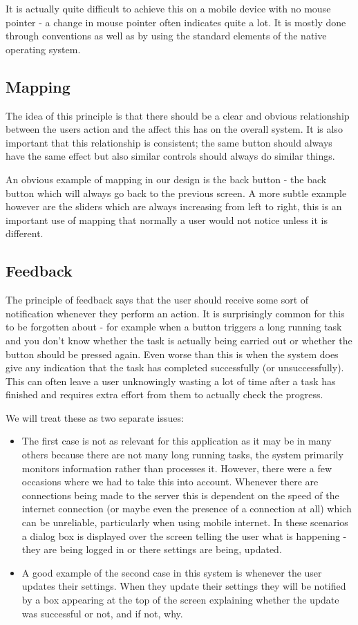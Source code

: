 \documentclass[a4paper]{report}
\begin{document}
{It is actually quite difficult to achieve this on a mobile device with no mouse pointer - a change in mouse pointer often indicates quite a lot. It is mostly done through conventions as well as by using the standard elements of the native operating system. 
\subsection*{Mapping}
The idea of this principle is that there should be a clear and obvious relationship between the users action and the affect this has on the overall system. It is also important that this relationship is consistent; the same button should always have the same effect but also similar controls should always do similar things.

An obvious example of mapping in our design is the back button - the back button which will always go back to the previous screen. A more subtle example however are the sliders which are always increasing from left to right, this is an important use of mapping that normally a user would not notice unless it is different.

\subsection*{Feedback}
The principle of feedback says that the user should receive some sort of notification whenever they perform an action. It is surprisingly common for this to be forgotten about - for example when a button triggers a long running task and you don't know whether the task is actually being carried out or whether the button should be pressed again. Even worse than this is when the system does give any indication that the task has completed successfully (or unsuccessfully). This can often leave a user unknowingly wasting a lot of time after a task has finished and requires extra effort from them to actually check the progress.

We will treat these as two separate issues:
\begin{itemize}
\item The first case is not as relevant for this application as it may be in many others because there are not many long running tasks, the system primarily monitors information rather than processes it. However, there were a few occasions where we had to take this into account. Whenever there are connections being made to the server this is dependent on the speed of the internet connection (or maybe even the presence of a connection at all) which can be unreliable, particularly when using mobile internet. In these scenarios a dialog box is displayed over the screen telling the user what is happening - they are being logged in or there settings are being,  updated.
\item A good example of the second case in this system is whenever the user updates their settings. When they update their settings they will be notified by a box appearing at the top of the screen explaining whether the update was successful or not, and if not, why.
\end{itemize}
}
\end{document}
